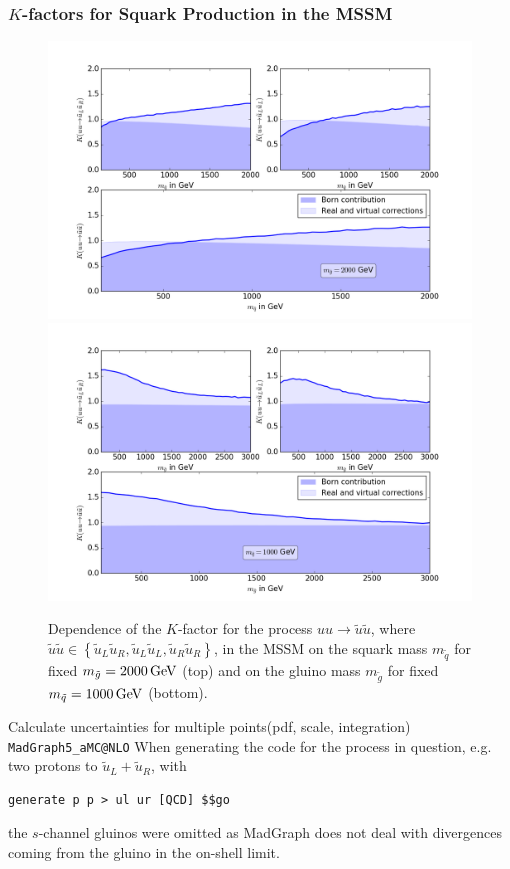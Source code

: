 \subsubsection{$K$-factors for Squark Production in the MSSM}
\begin{figure}[!htpb]
\begin{center}
\includegraphics[scale=.5]{figures/MSSM_uu_susu_Kfactors_msg=2000GeV.png}
\includegraphics[scale=.5]{figures/MSSM_uu_susu_Kfactors_msq=1000GeV.png}
\caption{Dependence of the $K$-factor for the process $uu \to \tilde{u}\tilde{u}$, where $\tilde{u}\tilde{u} \in \left\{ \tilde{u}_L\tilde{u}_R, \tilde{u}_L\tilde{u}_L, \tilde{u}_R\tilde{u}_R \right\}$, in the MSSM on the squark mass $m_{\tilde{q}}$ for fixed $m_{\tilde{g}} = \unit[2000]{GeV}$ (top) and on the gluino mass $m_{\tilde{g}}$ for fixed $m_{\tilde{q}} = \unit[1000]{GeV}$ (bottom).}\label{fig:1LXsection_fixed_m}
\end{center}
\end{figure}
Calculate uncertainties for multiple points(pdf, scale, integration)
\texttt{MadGraph5\_aMC@NLO}\cite{Alwall:2014hca}
When generating the code for the process in question, e.g. two protons to $\tilde{u}_L + \tilde{u}_R$, with
\begin{lstlisting}[style=Mybash]
generate p p > ul ur [QCD] $$go
\end{lstlisting}
the $s$-channel gluinos were omitted as MadGraph does not deal with divergences coming from the gluino in the on-shell limit.




